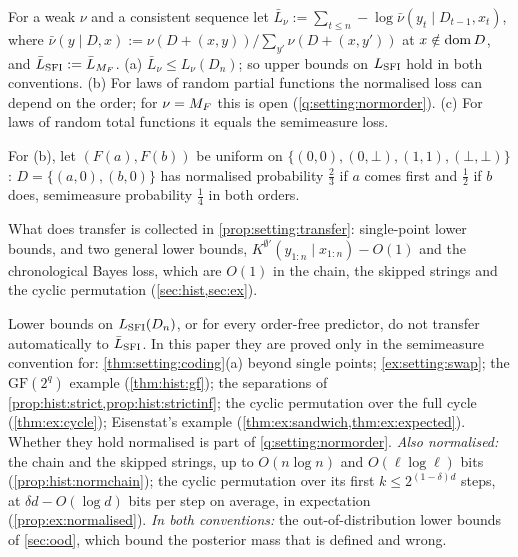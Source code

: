 \begin{proposition}[Normalisation]\label{prop:setting:normalise}
For a weak $\nu$ and a consistent sequence let $\bar L_\nu:=\sum_{t\le n}-\log\bar\nu(y_t\mid D_{t-1},x_t)$, where $\bar\nu(y\mid D,x):=\nu(D+(x,y))/\sum_{y'}\nu(D+(x,y'))$ at $x\notin\operatorname{dom} D$, and $\bar{L}_{\mathrm{SFI}}:=\bar L_{M_{F}}$. (a) $\bar L_\nu\le L_\nu(D_n)$; so upper bounds on $L_{\mathrm{SFI}}$ hold in both conventions. (b) For laws of random partial functions the normalised loss can depend on the order; for $\nu=M_{F}$ this is open (\cref{q:setting:normorder}). (c) For laws of random total functions it equals the semimeasure loss.
\end{proposition}

For (b), let $(F(a),F(b))$ be uniform on $\{(0,0),(0,\bot),(1,1),(\bot,\bot)\}$: $D=\{(a,0),(b,0)\}$ has normalised probability $\frac23$ if $a$ comes first and $\frac12$ if $b$ does, semimeasure probability $\frac14$ in both orders.

What does transfer is collected in \cref{prop:setting:transfer}: single-point lower bounds, and two general lower bounds, $K^{\emptyset'}(y_{1:n}\mid x_{1:n})-O(1)$ and the chronological Bayes loss, which are $O(1)$ in the chain, the skipped strings and the cyclic permutation (\cref{sec:hist,sec:ex}).

\begin{remark}\label{rem:setting:conventions}
Lower bounds on $L_{\mathrm{SFI}}(D_n)$, or for every order-free predictor, do not transfer automatically to $\bar{L}_{\mathrm{SFI}}$. In this paper they are proved only in the semimeasure convention for: \cref{thm:setting:coding}(a) beyond single points; \cref{ex:setting:swap}; the $\mathrm{GF}(2^q)$ example (\cref{thm:hist:gf}); the separations of \cref{prop:hist:strict,prop:hist:strictinf}; the cyclic permutation over the full cycle (\cref{thm:ex:cycle}); Eisenstat's example (\cref{thm:ex:sandwich,thm:ex:expected}). Whether they hold normalised is part of \cref{q:setting:normorder}.
\emph{Also normalised:} the chain and the skipped strings, up to $O(n\log n)$ and $O(\ell\log\ell)$ bits (\cref{prop:hist:normchain}); the cyclic permutation over its first $k\le2^{(1-\delta)d}$ steps, at $\delta d-O(\log d)$ bits per step on average, in expectation (\cref{prop:ex:normalised}).
\emph{In both conventions:} the out-of-distribution lower bounds of \cref{sec:ood}, which bound the posterior mass that is defined and wrong.
\end{remark}


